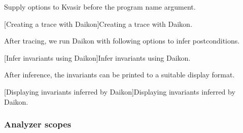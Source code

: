 Supply options to Kvasir before the program name argument.

\begin{center}
\begin{minipage}{\textwidth}
\captionsetup{type=lstlisting}
[Creating a trace with Daikon]{Creating a trace with Daikon.}
\label{lst:kvasir-bash}
\end{minipage}
\end{center}

After tracing, we run Daikon with following options to infer postconditions.

\begin{center}
\begin{minipage}{\textwidth}
\captionsetup{type=lstlisting}
[Infer invariants using Daikon]{Infer invariants using Daikon.}
\label{lst:daikon-bash}
\end{minipage}
\end{center}

After inference, the invariants can be printed to a suitable display format.

\begin{center}
\begin{minipage}{\textwidth}
\captionsetup{type=lstlisting}
[Displaying invariants inferred by Daikon]{Displaying invariants inferred by Daikon.}
\label{lst:print-bash}
\end{minipage}
\end{center}

\subsubsection{Analyzer scopes}\label{subsec:analyzer-scopes}

